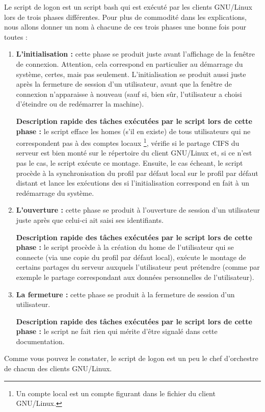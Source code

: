 Le script de logon est un script bash qui est exécuté
par les clients GNU/Linux lors de trois phases
différentes. Pour plus de commodité dans les explications,
nous allons donner un nom à chacune de ces trois
phases une bonne fois pour toutes :
%
\begin{enumerate}
\item \textbf{L'initialisation :} cette phase se produit juste avant
l'affichage de la fenêtre de connexion. Attention, cela
correspond en particulier au démarrage du système, certes, mais pas seulement. 
L'initialisation se produit aussi
juste après la fermeture de session d'un utilisateur, avant que
la fenêtre de connexion n'apparaisse à nouveau  (sauf si, bien sûr,
l'utilisateur a choisi d'éteindre ou de redémarrer la machine).
\label{initialisation}
\smallskip

\textbf{Description rapide des tâches exécutées par le script lors de cette phase :}
le script efface les homes (s'il en existe)
de tous utilisateurs qui ne correspondent pas à des comptes locaux%
\footnote{Un compte local est un compte figurant dans le fichier
 du client GNU/Linux.}, vérifie si
le partage CIFS  du serveur
est bien monté sur le répertoire  du client GNU/Linux et,
si ce n'est pas le cas, le script exécute ce montage. Ensuite,
le cas écheant, le script procède à la synchronisation
du profil par défaut local sur le profil par défaut distant et
lance les exécutions des  si l'initialisation
correspond en fait à un redémarrage du système.


\item \textbf{L'ouverture :} cette phase se produit à l'ouverture de 
session d'un utilisateur juste après que celui-ci ait saisi ses identifiants.
\label{ouverture}
\smallskip

\textbf{Description rapide des tâches exécutées par le script lors de cette phase :}
le script procède à la création
du home de l'utilisateur qui se connecte (via une
copie du profil par défaut local), exécute le montage
de certains partages du serveur auxquels l'utilisateur peut prétendre
(comme par exemple le partage correspondant aux données personnelles de
l'utilisateur).

\item \textbf{La fermeture :} cette phase se produit à 
la fermeture de session d'un utilisateur.
\label{fermeture}
\smallskip

\textbf{Description rapide des tâches exécutées par le script lors de cette phase :}
le script ne fait rien qui mérite d'être signalé dans cette documentation.
\end{enumerate}
%
Comme vous pouvez le constater, le script de logon est un peu le \og chef
d'orchestre \fg{} de chacun des clients GNU/Linux.

